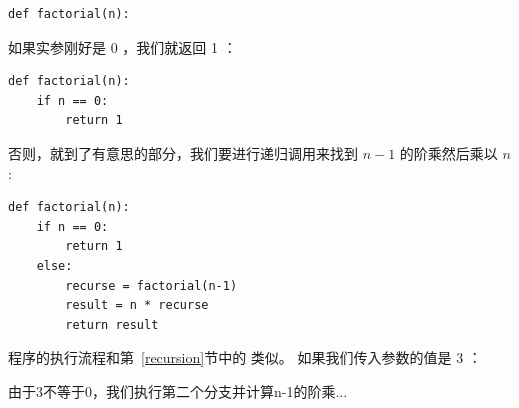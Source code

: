 \begin{lstlisting}
def factorial(n):
\end{lstlisting}

%

如果实参刚好是 0 ，我们就返回 1 ：


\begin{lstlisting}
def factorial(n):
    if n == 0:
        return 1
\end{lstlisting}

%

否则，就到了有意思的部分，我们要进行递归调用来找到 $n-1$ 的阶乘然后乘以 $n$:

\begin{lstlisting}
def factorial(n):
    if n == 0:
        return 1
    else:
        recurse = factorial(n-1)
        result = n * recurse
        return result
\end{lstlisting}

%

程序的执行流程和第~\ref{recursion}节中的  类似。
如果我们传入参数的值是 3 ：





由于3不等于0，我们执行第二个分支并计算n-1的阶乘...

